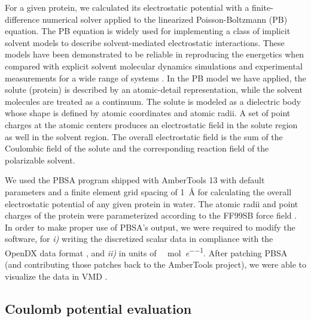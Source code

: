 For a given protein, we calculated its electrostatic potential with a
finite-difference numerical solver applied to the linearized Poisson-Boltzmann
(PB) equation. The PB equation is widely used for implementing a class of
implicit solvent models to describe solvent-mediated electrostatic interactions.
These models have been demonstrated to be reliable in reproducing the energetics
when compared with explicit solvent molecular dynamics simulations and
experimental measurements for a wide range of systems \cite{honig_estatic_1995}.
In the PB model we have applied, the solute (protein) is described by an
atomic-detail representation, while the solvent molecules are treated as a
continuum. The solute is modeled as a dielectric body whose shape is defined by
atomic coordinates and atomic radii. A set of point charges at the atomic
centers produces an electrostatic field in the solute region as well in the
solvent region. The overall electrostatic field is the sum of the Coulombic
field of the solute and the corresponding reaction field of the polarizable
solvent.

We used the PBSA program shipped with AmberTools 13 \cite{case_amber_12} with
default parameters and a finite element grid spacing of \SI{1}{\angstrom} for
calculating the overall electrostatic potential of any given protein in water.
The atomic radii and point charges of the protein were parameterized according
to the FF99SB force field \cite{case_amber_12}. In order to make proper use of
PBSA's output, we were required to modify the software, for \textit{i)}
writing the discretized scalar data in compliance with the OpenDX data format
\cite{opendx}, and \textit{ii)} in units of
\si{\kilo\calory\per\mole\per\elementarycharge}. After patching PBSA (and
contributing those patches back to the AmberTools project), we were able to
visualize the data in VMD \cite{vmd_1996}.


\subsection{Coulomb potential evaluation}

